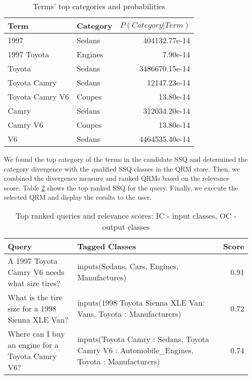 \begin{table}[h]\footnotesize

\begin{tabular}{| p{3.2cm} | l | r |}
\hline 
Term & Category & $P(Category|Term)$ \\ \hline
1997 & Sedans & 404132.77e-14\\ 
1997 Toyota & Engines & 7.90e-14\\ 
Toyota  & Sedans & 3486670.15e-14\\ 
Toyota Camry & Sedans & 12147.23e-14\\ 
Toyota Camry V6 & Coupes & 13.80e-14\\ 
Camry & Sedans & 312034.20e-14\\ 
Camry V6 & Coupes & 13.80e-14\\ 
V6 & Sedans & 4464535.40e-14\\ \hline
\end{tabular}        

\caption{Terms' top categories and probabilities}
\label{tbl:term_categories}   

\end{table}

We found the top category of the terms in the candidate SSQ and determined the category divergence with the qualified SSQ classes in the QRM store. Then, we combined the divergence measure and
ranked QRMs based on the relevance score. Table \ref{tbl:ranked_queries} shows the top ranked SSQ for the query.  Finally, we execute the selected QRM and display the results to the user.

\begin{table}[h]\footnotesize

\begin{tabular}{| p{3.5cm} | p{3cm} | r |}
	\hline
	Query & Tagged Classes & Score\\ 
	\hline
	A 1997 Toyota Camry V6 needs what size tires? & inputs(Sedans, Cars, Engines, Manufactures) & 0.91\\ 
	\hline 
	What is the tire size for a 1998 Sienna XLE Van? & inputs(1998 Toyota Sienna XLE Van: Vans, Toyota : Manufacturers) & 0.72\\ 	\hline 
	Where can I buy an engine for a Toyota Camry V6? & inputs(Toyota Camry : Sedans, Toyota Camry V6 : Automobile_Engines, Toyota : Manufacturers) & 0.74 \\
	\hline 
\end{tabular}

\caption{Top ranked queries and relevance scores: IC - input classes, OC - output classes}
\label{tbl:ranked_queries}   

\end{table}


